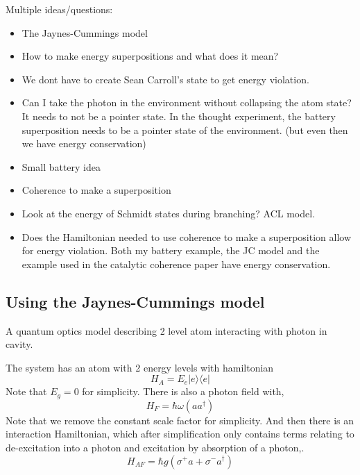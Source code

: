 \documentclass{article}
\begin{document}
Multiple ideas/questions: 
\begin{itemize}
    \item The Jaynes-Cummings model 
    \item How to make energy superpositions and what does it mean?
    \item We dont have to create Sean Carroll's state to get energy violation.
    \item Can I take the photon in the environment without collapsing the atom state? It needs to not be a pointer state. In the thought experiment, the battery superposition needs to be a pointer state of the environment. (but even then we have energy conservation) 
    \item Small battery idea
    \item Coherence to make a superposition
    \item Look at the energy of Schmidt states during branching? ACL model.
    \item Does the Hamiltonian needed to use coherence to make a superposition allow for energy violation. Both my battery example, the JC model and the example used in the catalytic coherence paper have energy conservation.
\end{itemize}

\begin{comment}
-something about how, in the ACL model, looking at graphs that show the system and environments exchange energy, is a very clear demo that the energy structure of the system and the environment can change. (leads to question, how does the distribution in the basis of E and S change as we go to equilibrium?)
\end{comment}


\subsection{Using the Jaynes-Cummings model}
A quantum optics model describing 2 level atom interacting with photon in cavity.

The system has an atom with 2 energy levels with hamiltonian 
\begin{equation}
    H_A=E_e|e\rangle\langle e|
\end{equation}
Note that $E_g=0$ for simplicity.
There is also a photon field with, 
\begin{equation}
    H_F=\hbar\omega(aa^{\dagger})
\end{equation}
Note that we remove the constant scale factor for simplicity.
And then there is an interaction Hamiltonian, which after simplification only contains terms relating to de-excitation into a photon and excitation by absorption of a photon,.
\begin{equation}
    H_{AF}=\hbar g(\sigma^{+}a+\sigma^-a^{\dagger})
\end{equation}
\end{document}
